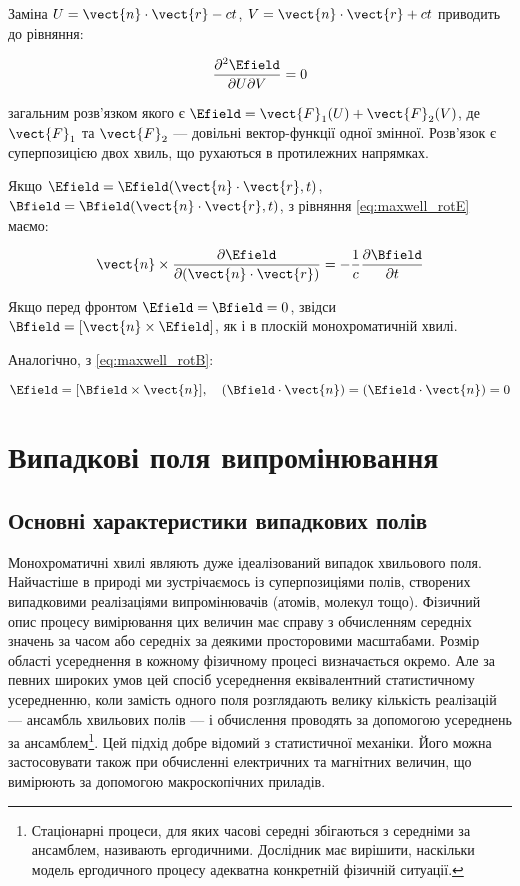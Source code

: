 Заміна \(U = \vect{n} \cdot \vect{r} - ct\), \(V = \vect{n} \cdot \vect{r} + ct\) приводить до рівняння:

\begin{equation*}
\frac{\partial^2 \Efield}{\partial U \partial V} = 0
\end{equation*}

загальним розв’язком якого є \(\Efield = \vect{F}_1(U) + \vect{F}_2(V)\), де \(\vect{F}_1\) та \(\vect{F}_2\) --- довільні вектор-функції одної
змінної. Розв’язок є суперпозицією двох хвиль, що рухаються в протилежних напрямках.

Якщо \(\Efield = \Efield(\vect{n} \cdot \vect{r}, t)\), \(\Bfield = \Bfield(\vect{n} \cdot \vect{r}, t)\), з рівняння \eqref{eq:maxwell_rotE} маємо:

\begin{equation*}
\vect{n} \times \frac{\partial \Efield}{\partial (\vect{n} \cdot \vect{r})} = -\frac{1}{c} \frac{\partial \Bfield}{\partial t}
\end{equation*}

Якщо перед фронтом \(\Efield = \Bfield = 0\), звідси \(\Bfield = [\vect{n} \times \Efield]\), як і в плоскій монохроматичній хвилі.

Аналогічно, з \eqref{eq:maxwell_rotB}:

\begin{equation*}
\Efield = [\Bfield \times \vect{n}], \quad (\Bfield \cdot \vect{n}) = (\Efield \cdot \vect{n}) = 0
\end{equation*}

\section{Випадкові поля випромінювання}

\subsection*{Основні характеристики випадкових полів}

Монохроматичні хвилі являють дуже ідеалізований випадок хвильового поля. Найчастіше в природі ми зустрічаємось із суперпозиціями полів, створених
випадковими реалізаціями випромінювачів (атомів, молекул тощо). Фізичний опис процесу вимірювання цих величин має справу з обчисленням середніх значень
за часом або середніх за деякими просторовими масштабами. Розмір області усереднення в кожному фізичному процесі визначається окремо. Але за певних
широких умов цей спосіб усереднення еквівалентний статистичному усередненню, коли замість одного поля розглядають велику кількість реалізацій ---
ансамбль хвильових полів --- і обчислення проводять за допомогою усереднень за ансамблем\footnote{Стаціонарні процеси, для яких часові середні
збігаються з середніми за ансамблем, називають ергодичними. Дослідник має вирішити, наскільки модель ергодичного процесу адекватна конкретній фізичній
ситуації.}. Цей підхід добре відомий з статистичної механіки. Його можна застосовувати також при обчисленні електричних та магнітних величин, що
вимірюють за допомогою макроскопічних приладів.

